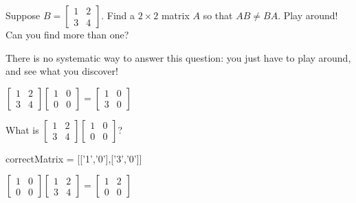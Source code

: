 \documentclass{ximera}
\begin{document}
\begin{question}
  Suppose $B = \begin{bmatrix} 1 & 2 \\ 3 & 4 \end{bmatrix}$.  Find a $2 \times 2$ matrix $A$ so that $AB \neq BA$.  Play around!  Can you find more than one?

  \begin{solution}
  	\begin{hint}
  		There is no systematic way to answer this question:  you just have to play around, and see what you discover!
  	\end{hint}
  	\begin{hint}
  		\begin{question}
  			\begin{solution}
  				\begin{hint}
  					$\begin{bmatrix} 1 & 2 \\ 3 & 4 \end{bmatrix} \begin{bmatrix}  1 &0 \\ 0&0\end{bmatrix}  = \begin{bmatrix} 1 & 0\\ 3&0 \end{bmatrix}$
  				\end{hint}
  				What is $\begin{bmatrix} 1 & 2 \\ 3 & 4 \end{bmatrix} \begin{bmatrix}  1 &0 \\ 0&0\end{bmatrix}$?
  					\begin{matrix-answer}[name=A]
  						correctMatrix = [['1','0'],['3','0']]
  					\end{matrix-answer}
  			\end{solution}
  		\end{question}
  		\begin{question}
  			\begin{solution}
  				\begin{hint}
  					$\begin{bmatrix}  1 &0 \\ 0&0\end{bmatrix}  \begin{bmatrix} 1 & 2 \\ 3 & 4 \end{bmatrix}  = \begin{bmatrix} 1 & 2\\ 0&0 \end{bmatrix}$

\end{hint}
\end{solution}
\end{question}
\end{hint}
\end{solution}
\end{question}
\end{document}
